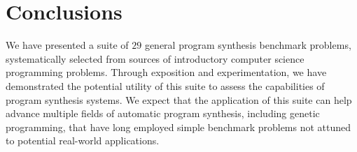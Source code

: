 \documentclass{sig-alternate}
\begin{document}
%
%



\section{Conclusions}

We have presented a suite of $29$ general program synthesis benchmark problems, systematically selected from sources of introductory computer science programming problems. Through exposition and experimentation, we have demonstrated the potential utility of this suite to assess the capabilities of program synthesis systems. We expect that the application of this suite can help advance multiple fields of automatic program synthesis, including genetic programming, that have long employed simple benchmark problems not attuned to potential real-world applications.
\end{document}

